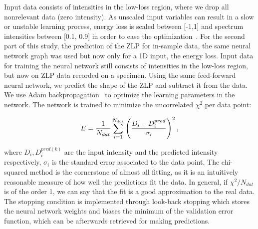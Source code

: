 %
%
%



%
Input data consists of intensities in the low-loss region, 
where we drop all nonrelevant data (zero intensity). As unscaled input variables
can result in a slow or unstable learning process,
energy loss is scaled between [-1,1] and spectrum intensities between [0.1, 0.9]
in order to ease the optimization~\cite{Ball:2008by}.
%
For the second part of this study, the prediction of the ZLP for in-sample data,
the same neural network graph was used but now only for a 1D input, the energy loss. 
%
Input data for training the neural network still consists of intensities in the low-loss region, 
but now on ZLP data recorded on a specimen. Using the same feed-forward neural network,
we predict the shape of the ZLP and subtract it from the data.
%
We use Adam backpropagation~\cite{Kingma:2017} to optimize the learning parameters in the network. 
The network is trained to minimize the uncorrelated $\chi^2$ per data point:

\begin{equation}\label{eq:chi2}
\begin{centering}
    E = \frac{1}{N_{dat}}\sum_{i=1}^{N_{dat}}\left(\frac{D_i - D_i^{pred}}{\sigma_i}\right)^2, 
\end{centering}
\end{equation}

where $D_i, D_i^{pred(k)}$ are the input intensity and the predicted 
intensity respectively,
$\sigma_i$ is the standard error associated to the data point. 
%
The chi-squared method is the cornerstone of almost all fitting, as it is 
an intuitively reasonable measure of how well the predictions fit the data.
In general, if $\chi^2/N_{dat}$ is of the order 1, we can say that the fit is a 
good approximation to the real data. \\
%
The stopping condition is implemented through look-back stopping which stores 
the neural network weights and biases the minimum of the validation error function,  
which can be afterwards retrieved for 
making predictions.
%

